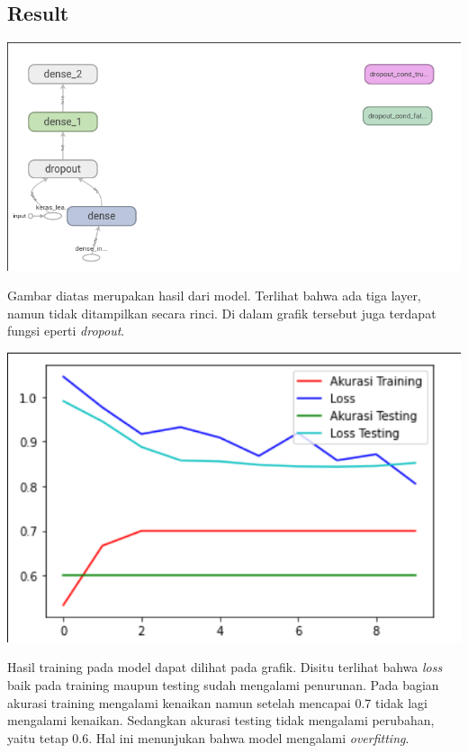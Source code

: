 \documentclass[12pt, a4paper]{article}
\begin{document}
\begin{multicols}{2}
\section{Result}

\centering
\vspace{0.2cm}
\includegraphics[scale=0.25]{model_graph}
\vspace{0.2cm}

\justifying
Gambar diatas merupakan hasil dari model. Terlihat bahwa ada tiga layer, namun tidak ditampilkan secara rinci. Di dalam grafik tersebut juga terdapat fungsi eperti \textit{dropout}.

\centering
\vspace{0.2cm}
\includegraphics[scale=0.3]{acc}
\vspace{0.2cm}

\justifying
Hasil training pada model dapat dilihat pada grafik. Disitu terlihat bahwa \textit{loss} baik pada training maupun testing sudah mengalami penurunan. Pada bagian akurasi training mengalami kenaikan namun setelah mencapai 0.7 tidak lagi mengalami kenaikan. Sedangkan akurasi testing tidak mengalami perubahan, yaitu tetap 0.6. Hal ini menunjukan bahwa model mengalami \textit{overfitting}.


\end{multicols}
\end{document}
